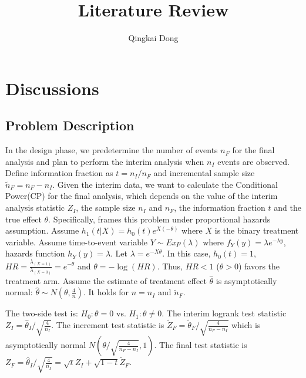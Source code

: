 \documentclass[12pt]{article}
\title{Literature Review}
\author{Qingkai Dong\\
}
\begin{document}
\maketitle

\begin{abstract}

\end{abstract}

\doublespacing

\section{Discussions}

\subsection{Problem Description}

In the design phase, we predetermine the number of events $n_{F}$ for the final
analysis and plan to perform the interim analysis when $n_{I}$ events are
observed. Define information fraction as $t=n_{I}/n_{F}$ and incremental sample
size $\tilde{n}_{F}=n_{F}-n_{I}$.  Given the interim data, we want to calculate
the Conditional Power(CP) for the final analysis, which depends on the value of
the interim analysis statistic $Z_{I}$, the sample size $n_{I}$ and $n_{F}$, the
information fraction $t$ and the true effect $\theta$. Specifically,
\citep{teng2020seamless} frames this problem under proportional hazards
assumption.  Assume $h_{1}(t|X) = h_{0}(t) e^{X(-\theta)}$ where $X$ is the
binary treatment variable. Assume time-to-event variable $Y \sim Exp(\lambda)$
where $f_{Y}(y)=\lambda e^{-\lambda y}$, hazards function
$h_{Y}(y)=\lambda$. Let $\lambda=e^{-X\theta}$. In this case, $h_{0}(t)=1$,
$HR=\frac{\lambda_{(X=1)}}{\lambda_{(X=0)}}=e^{-\theta}$ and
$\theta=-\log(HR)$. Thus, $HR < 1$ ($\theta > 0$) favors the treatment
arm. Assume the estimate of treatment effect $\hat{\theta}$ is asymptotically
normal: $\hat{\theta} \sim N(\theta, \frac{4}{n})$. It holds for $n=n_{I}$ and
$\tilde{n}_{F}$.

The two-side test is: $H_0: \theta=0$ vs. $H_1: \theta \neq 0$. The interim
logrank test statistic $Z_{I} = \hat{\theta}_{I} / \sqrt{\frac{4}{n_{I}}}$. The
increment test statistic is $\tilde{Z}_{F} = \tilde{\theta}_{F} /
\sqrt{\frac{4}{n_{F}-n_{I}}}$ which is asymptotically normal $N(\theta /
\sqrt{\frac{4}{n_{F}-n_{I}}}, 1)$. The
final test statistic is $Z_{F} = \hat{\theta}_{I} / \sqrt{\frac{4}{n_{I}}} =
\sqrt{t}Z_{I} + \sqrt{1-t}\tilde{Z}_{F}$.
\end{document}
